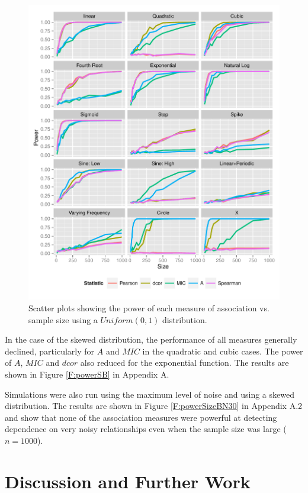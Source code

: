\documentclass[a4paper, 12pt]{report}
\begin{document}
\begin{figure}[H]
\begin{center}
\includegraphics[width=\textwidth]{powerSizeUN10.pdf}
\caption{Scatter plots showing the power of each measure of association vs. sample size using a $Uniform(0,1)$ distribution.} 
\label{F:powerSizeUN10}
\end{center}
\end{figure}

In the case of the skewed distribution, the performance of all measures generally declined, particularly for $A$ and $MIC$ in the quadratic and cubic cases. The power of $A$, $MIC$ and $dcor$ also reduced for the exponential function. The results are shown in Figure \ref{F:powerSB} in Appendix A.

Simulations were also run using the maximum level of noise and using a skewed distribution. The results are shown in Figure \ref{F:powerSizeBN30} in Appendix A.2 and show that none of the association measures were powerful at detecting dependence on very noisy relationships even when the sample size was large ($n=1000$).

\chapter{Discussion and Further Work}
\end{document}
